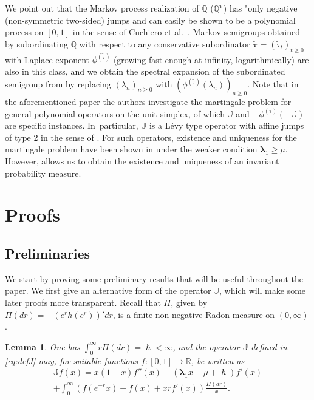 \documentclass[JEP,XML,SOM,Unicode]{cedram}
\theoremstyle{plain}
\newtheorem{lemma}[theorem]{Lemma}
\theoremstyle{definition}
\newcommand{\R}{\mathbb{R}}
\newcommand{\J}{\mathds{Q}}
\newcommand{\calJ}{\mathds{J}}
\newcommand{\lam}{{\bm{\lambda}_1}}
\let\h\hslash
\let\mo\mu
\begin{document}
We point out that the Markov process realization of $\J$ (\resp $\J^{\bm{\tau}}$) has "only negative (\resp non-symmetric two-sided) jumps and can easily be shown to be a polynomial process on $[0,1]$ in the sense of Cuchiero et al.~\cite{cuchiero2018}. Markov semigroups obtained by subordinating $\J$ with respect to any conservative subordinator $\widetilde{\bm{\tau}} = (\widetilde{\tau}_t)_{t \geq 0}$ with Laplace exponent $\phi^{(\widetilde{\tau})}$ (growing fast enough at infinity, \eg logarithmically) are also in this class, and we obtain the spectral expansion of the subordinated semigroup
from  by replacing $(\lambda_n)_{n \geq 0}$ with $(\phi^{(\widetilde{\tau})}(\lambda_n))_{n \geq 0}$. Note that in the aforementioned paper the authors investigate the martingale problem for general polynomial operators on the unit simplex, of which $\calJ$ and $-\phi^{(\tau)}(-\calJ)$ are specific instances. In~particular, $\calJ$ is a Lévy type operator with affine jumps of type 2 in the sense of \cite{cuchiero2018}. For such operators, existence and uniqueness for the martingale problem have been shown in \cite{cuchiero2018} under the weaker condition $\lam \geq \mo$. However,  allows us to obtain the existence and uniqueness of an invariant probability measure.

\section{Proofs} \label{sec:proofs}

\subsection{Preliminaries}
We start by proving some preliminary results that will be useful throughout the paper. We first give an alternative form of the operator $\calJ$, which will make some later proofs more transparent.
Recall that $\Pi$, given by $\Pi(dr) = -(e^rh(e^r))'dr$, is a finite non-negative Radon measure on $(0,\infty)$.

\begin{lemma}
\label{lem:rewriting-stuff}
One has $\int_0^\infty r\Pi(dr) = \h < \infty$, and the operator $\calJ$ defined in \eqref{eq:defJ} may,
for suitable functions $f \colon [0,1] \to \R$, be written as
\begin{multline*}
\calJ f(x) = x(1-x)f''(x) - (\lam x-\mo+\h)f'(x)\\
+ \int_{0}^{\infty} \left(f(e^{-r}x)-f(x)+xrf'(x)\right)\frac{\Pi(dr)}{x}.
\end{multline*}
\end{lemma}
\end{document}
